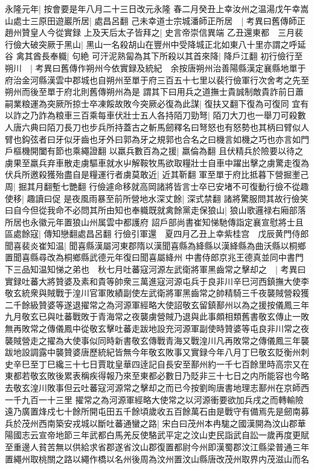 永隆元年|{
	按會要是年八月二十三日改元永隆}
春二月癸丑上幸汝州之温湯戊午幸嵩山處士三原田遊巖所居|{
	處昌呂翻}
己未幸道士宗城潘師正所居　|{
	考異曰舊傳師正趙州贊皇人今從實録}
上及天后太子皆拜之|{
	史言帝崇信異端}
乙丑還東都　三月裴行儉大破突厥于黑山|{
	黑山一名殺胡山在豐州中受降城正北如東八十里亦謂之呼延谷}
禽其酋長奉軄|{
	句絶}
可汗泥熟匐為其下所殺以其首來降|{
	降戶江翻}
初行儉行至朔川　|{
	考異曰舊傳作朔州今依實録及統紀　余按唐朔州治善陽縣漢定襄縣地單于府治金河縣漢雲中郡城也自朔州至單于府三百五十七里以裴行儉軍行次舍考之先至朔州而後至單于府北則舊傳朔州為是}
謂其下曰用兵之道撫士貴誠制敵貴詐前日蕭嗣業粮運為突厥所掠士卒凍餒故敗今突厥必復為此謀|{
	復扶又翻下復為可復同}
宜有以詐之乃詐為粮車三百乘每車伏壯士五人各持陌刀勁弩|{
	陌刀大刀也一舉刀可殺數人唐六典曰陌刀長刀也步兵所持蓋古之斬馬劒釋名曰弩怒也有怒勢也其柄曰臂似人臂也鈎弦者曰牙似牙齒也牙外曰郭為牙之規郭也合名之曰機言如機之巧也亦言如門戶樞機開闔有節也乘繩證翻}
以羸兵數百為之援|{
	羸倫為翻}
且伏精兵於險要以待之虜果至羸兵弃車散走虜驅車就水屮解鞍牧馬欲取糧壯士自車中躍出擊之虜驚走復為伏兵所邀殺獲殆盡自是糧運行者虜莫敢近|{
	近其靳翻}
軍至單于府比抵暮下營掘壍己周|{
	掘其月翻塹七艷翻}
行儉遽命移就高岡諸將皆言士卒已安堵不可復動行儉不從趣使移|{
	趣讀曰促}
是夜風雨暴至前所營地水深丈餘|{
	深式禁翻}
諸將驚服問其故行儉笑曰自今但從我命不必問其所由知也奉軄既就禽餘黨走保狼山|{
	狼山歌邏禄右廂部落所居也永徽元年置狼山州属雲中都護府}
詔戶部尚書崔知悌馳傳詣定襄宣慰將士且區處餘寇|{
	傳知戀翻處昌呂翻}
行儉引軍還　夏四月乙丑上幸紫桂宫　戊辰黄門侍郎聞喜裴炎崔知温|{
	聞喜縣漢屬河東郡隋以漢聞喜縣為絳縣以漢絳縣為曲沃縣以桐鄉置聞喜縣尋改為桐鄉縣武德元年復曰聞喜屬絳州}
中書侍郎京兆王德真並同中書門下三品知温知悌之弟也　秋七月吐蕃寇河源左武衛將軍黑齒常之擊却之　|{
	考異曰實録吐蕃大將贊婆及素和貴等帥衆三萬進寇河源屯兵于良非川辛巳河西鎮撫大使李敬玄統衆與賊戰于湟川官軍敗績副使左武衛將軍黑齒常之帥精騎三千夜襲賊營殺獲二千餘級贊婆等遂退擢常之為河源軍經略大使詔敬玄留鎮鄯州以為之援按儀鳳三年九月敬玄已與吐蕃戰敗于青海常之夜襲虜營賊乃退與此事頗相類舊書敬玄傳止一敗無再敗常之傳儀鳳中從敬玄擊吐蕃走跋地設充河源軍副使時贊婆等屯良非川常之夜襲賊營走之擢為大使事似同時新書敬玄傳戰青海又戰湟川凡再敗常之傳儀鳳三年襲跋地設調露中襲贊婆唐歷統紀皆無今年敬玄敗事又實録今年八月丁巳敬玄貶衡州刺史辛巳至丁巳纔三十七日賈耽皇華四逹記自長安至鄯州約一千七百餘里時高宗又在東都若敬玄敗後累表稱疾得報乃來至東都必數日乃貶非三十七日之内所能容也今略去敬玄湟川敗事但云吐蕃寇河源常之擊却之而已今按劉㫬唐書地理志鄯州在京師西一千九百一十三里}
擢常之為河源軍經略大使常之以河源衝要欲加兵戌之而轉輸險遠乃廣置烽戍七十餘所開屯田五千餘頃歲收五百餘萬石由是戰守有備焉先是劒南募兵於茂州西南築安戎城以斷吐蕃通蠻之路|{
	宋白曰茂州本冉駹之國漢開為汶山郡華陽國志云宣帝地節三年武都白馬羌反使駱武平定之汶山吏民詣武自訟一歲再度更賦至重邊人貧苦無以供給求省郡遂省汶山郡復置都尉今州即漢蜀郡汶江縣梁普通三年置繩州取桃關之路以繩作橋以名州後周為汶州置汶山縣唐改茂州取界内茂滋山而名}
